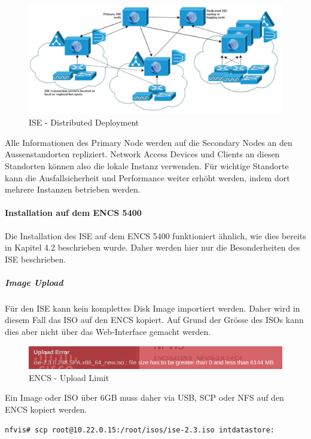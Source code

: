 \begin{figure}[H]
	\centering
	\includegraphics[width=0.8\linewidth]{img/Absicherung/ISE-Distributed-Deployment.png}
	\caption{ISE - Distributed Deployment \cite{ise-install-guide}}
	\label{fig:ISE - Distributed Deployment}
\end{figure}

Alle Informationen des Primary Node werden auf die Secondary Nodes an den Aussenstandorten repliziert. Network Access Devices und Clients an diesen Standorten können also die lokale Instanz verwenden.  Für wichtige Standorte kann die Ausfallsicherheit und Performance weiter erhöht werden, indem dort mehrere Instanzen betrieben werden.

\paragraph{Installation auf dem ENCS 5400}

Die Installation des ISE auf dem ENCS 5400 funktioniert ähnlich, wie dies bereits in Kapitel 4.2 beschrieben wurde. Daher werden hier nur die Besonderheiten des ISE beschrieben.

\subparagraph{Image Upload}
Für den ISE kann kein komplettes Disk Image importiert werden. Daher wird in diesem Fall das ISO auf den ENCS kopiert. Auf Grund der Grösse des ISOs kann dies aber nicht über das Web-Interface gemacht werden.

\begin{figure}[H]
	\centering
	\includegraphics[width=0.8\linewidth]{img/Absicherung/ENCS-Upload-Limit.png}
	\caption{ENCS - Upload Limit}
	\label{fig:ENCS - Upload Limit}
\end{figure}

Ein Image oder ISO über 6GB muss daher via USB, SCP oder NFS auf den ENCS kopiert werden. 

\begin{lstlisting}[language=bash]
nfvis# scp root@10.22.0.15:/root/isos/ise-2.3.iso intdatastore:
\end{lstlisting}

